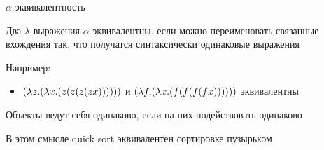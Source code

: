 \begin{frame}{$\alpha$-эквивалентность}
\begin{definition}
Два $\lambda$-выражения $\alpha$-эквивалентны, если можно переименовать связанные вхождения так, что получатся синтаксически одинаковые выражения
\end{definition}
Например:
\begin{itemize}
\item $(\lambda z . (\lambda x . (z (z (z (z x))))))$ и $(\lambda f . (\lambda x . (f (f (f (f x))))))$ эквивалентны \IV{}
\end{itemize}
\begin{definition}
Объекты ведут себя одинаково, если на них подействовать одинаково
\end{definition}
В этом смысле quick sort эквивалентен сортировке пузырьком
\end{frame}

